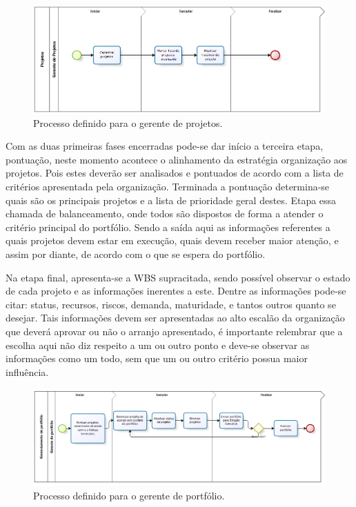 \documentclass[12pt,a4paper,ruledheader,tocpage=prefix,floatnumber=continuous,pagestart=folhaderosto,font=times]{abnt}
\begin{document}
\begin{figure}[H]
\centering
\includegraphics[width=.9\textwidth]{Projetos.png}
\caption{Processo definido para o gerente de projetos.}
\end{figure}

Com as duas primeiras fases encerradas pode-se dar início a terceira etapa, pontuação, neste momento acontece o alinhamento da estratégia organização 
aos projetos. Pois estes deverão ser analisados e pontuados de acordo com a lista de critérios apresentada pela organização. Terminada a pontuação 
determina-se quais são os principais projetos e a lista de prioridade geral destes. Etapa essa chamada de balanceamento, onde todos são dispostos de 
forma a atender o critério principal do portfólio. Sendo a saída aqui as informações referentes a quais projetos devem estar em execução, quais devem 
receber maior atenção, e assim por diante, de acordo com o que se espera do portfólio.

Na etapa final, apresenta-se a WBS supracitada, sendo possível observar o estado de cada projeto e as informações inerentes a este. Dentre as informações
pode-se citar: status, recursos, riscos, demanda, maturidade, e tantos outros quanto se desejar. Tais informações devem ser apresentadas ao alto escalão 
da organização que deverá aprovar ou não o arranjo apresentado, é importante relembrar que a escolha aqui não diz respeito a um ou outro ponto e deve-se 
observar as informações como um todo, sem que um ou outro critério possua maior influência. 

\begin{figure}[H]
\centering
\includegraphics[width=.9\textwidth]{GerenciaPortfolio.png}
\caption{Processo definido para o gerente de portfólio.}
\end{figure}
\end{document}
